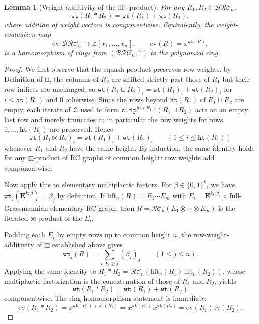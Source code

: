 \documentclass{amsart}
\newtheorem{lemma}{Lemma}[subsection]
\theoremstyle{definition}
\theoremstyle{remark}
\numberwithin{equation}{subsection}
\newcommand{\wtt}{\mathtt{wt}}
\newcommand{\zeromap}{\mathcal{Z}}
\newcommand{\hr}{\mathtt{ht}}
\newcommand{\clp}{\mathtt{clip}}
\newcommand{\BRC}{\mathcal{BRC}}
\newcommand{\RC}{\mathcal{RC}}
\begin{document}
\begin{lemma}[Weight-additivity of the lift product]\label{lemma:liftweight}
For any $R_1, R_2\in\BRC_n$,
$$\wtt(R_1 * R_2) = \wtt(R_1) + \wtt(R_2),$$
where addition of weight vectors is componentwise. Equivalently, the weight-evaluation map
$$\mathrm{ev}:\BRC_n\to\mathbb{Z}[x_1,\ldots,x_n],\qquad \mathrm{ev}(R) = x^{\wtt(R)},$$
is a homomorphism of rings from $(\BRC_n,*)$ to the polynomial ring.
\end{lemma}
\begin{proof}
We first observe that the squash product preserves row weights: by Definition of $\sqcup$, the columns of $R_2$ are shifted strictly past those of $R_1$ but their row indices are unchanged, so $\wtt(R_1\sqcup R_2)_i = \wtt(R_1)_i + \wtt(R_2)_i$ for $i\leq \hr(R_1)$ and $0$ otherwise. Since the rows beyond $\hr(R_1)$ of $R_1\sqcup R_2$ are empty, each iterate of $\zeromap$ used to form $\clp^{\hr(R_1)}(R_1\sqcup R_2)$ acts on an empty last row and merely truncates it; in particular the row weights for rows $1,\ldots,\hr(R_1)$ are preserved. Hence
$$\wtt(R_1\boxtimes R_2)_i = \wtt(R_1)_i + \wtt(R_2)_i\qquad (1\leq i\leq \hr(R_1))$$
whenever $R_1$ and $R_2$ have the same height. By induction, the same identity holds for any $\boxtimes$-product of RC graphs of common height: row weights add componentwise.

Now apply this to elementary multiplactic factors. For $\beta\in\{0,1\}^k$, we have $\wtt_j(\mathbf{E}^{k;\beta}) = \beta_j$ by definition. If $\mathrm{lift}_n(R) = E_1\cdots E_m$ with $E_i = \mathbf{E}^{k_i;\beta_i}$ a full-Grassmannian elementary RC graph, then $R = \RC_n(E_1\otimes\cdots\otimes E_m)$ is the iterated $\boxtimes$-product of the $E_i$.

Padding each $E_i$ by empty rows up to common height $n$, the row-weight-additivity of $\boxtimes$ established above gives
$$\wtt_j(R) = \sum_{i:\,k_i\geq j} (\beta_i)_j\qquad (1\leq j\leq n).$$
Applying the same identity to $R_1*R_2 = \RC_n(\mathrm{lift}_n(R_1)\,\mathrm{lift}_n(R_2))$, whose multiplactic factorization is the concatenation of those of $R_1$ and $R_2$, yields
$$\wtt(R_1*R_2) = \wtt(R_1) + \wtt(R_2)$$
componentwise. The ring-homomorphism statement is immediate:
$$\mathrm{ev}(R_1*R_2) = x^{\wtt(R_1)+\wtt(R_2)} = x^{\wtt(R_1)}\,x^{\wtt(R_2)} = \mathrm{ev}(R_1)\mathrm{ev}(R_2).$$
\end{proof}
\end{document}
